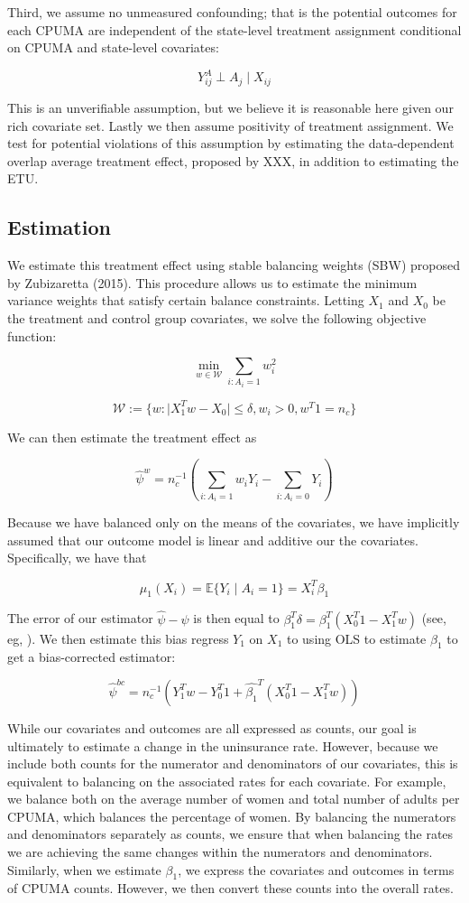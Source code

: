 \documentclass[final]{article}
\begin{document}
Third, we assume no unmeasured confounding; that is the potential outcomes for each CPUMA are independent of the state-level treatment assignment conditional on CPUMA and state-level covariates:

$$
Y_{ij}^A \perp A_j \mid X_{ij}
$$

This is an unverifiable assumption, but we believe it is reasonable here given our rich covariate set. Lastly we then assume positivity of treatment assignment. We test for potential violations of this assumption by estimating the data-dependent overlap average treatment effect, proposed by XXX, in addition to estimating the ETU.

\subsection{Estimation}

We estimate this treatment effect using stable balancing weights (SBW) proposed by Zubizaretta (2015). This procedure allows us to estimate the minimum variance weights that satisfy certain balance constraints. Letting $X_1$ and $X_0$ be the treatment and control group covariates, we solve the following objective function:

$$
\min_{w \in \mathcal{W}} \sum_{i: A_i = 1} w_i^2
$$

$$
\mathcal{W} := \{w: \mid X_1^Tw - X_0 \mid \le \delta, w_i > 0, w^T1 = n_c\}
$$

We can then estimate the treatment effect as

$$
\hat{\psi}^w = n_c^{-1}(\sum_{i: A_i = 1}w_iY_i - \sum_{i: A_i = 0}Y_i)
$$

Because we have balanced only on the means of the covariates, we have implicitly assumed that our outcome model is linear and additive our the covariates. Specifically, we have that 

$$
\mu_1(X_i) = \mathbb{E}\{Y_i \mid A_i = 1\} = X_i^T\beta_1 
$$

The error of our estimator $\hat{\psi} - \psi$ is then equal to $\beta_1^T \delta = \beta_1^T(X_0^T1 - X_1^Tw)$ (see, eg, \cite{zubizarreta2015stable}). We then estimate this bias regress $Y_1$ on $X_1$ to using OLS to estimate $\beta_1$ to get a bias-corrected estimator:

$$
\hat{\psi}^{bc} = n_c^{-1}(Y_1^Tw - Y_0^T1 + \hat{\beta_1}^T(X_0^T1 - X_1^Tw))
$$

While our covariates and outcomes are all expressed as counts, our goal is ultimately to estimate a change in the uninsurance rate. However, because we include both counts for the numerator and denominators of our covariates, this is equivalent to balancing on the associated rates for each covariate. For example, we balance both on the average number of women and total number of adults per CPUMA, which balances the percentage of women. By balancing the numerators and denominators separately as counts, we ensure that when balancing the rates we are achieving the same changes within the numerators and denominators. Similarly, when we estimate $\beta_1$, we express the covariates and outcomes in terms of CPUMA counts. However, we then convert these counts into the overall rates.
\end{document}
